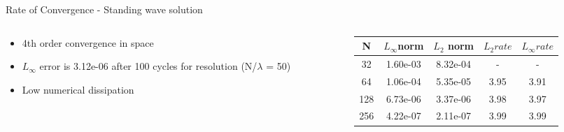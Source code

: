 \documentclass[10pt, aspectratio=169]{beamer}
\begin{document}
\begin{frame}{Rate of Convergence - Standing wave solution}
	\begin{columns}
		\begin{column}{0.45\textwidth}
			\begin{itemize}
				\item 4th order convergence in space
				\item $L_{\infty}$ error is 3.12e-06 after 100 cycles for resolution (N/$\lambda$ = 50)
				\item Low numerical dissipation
			\end{itemize}
		\end{column}
		\begin{column}{0.55\textwidth}
			\begin{tabular}{ |c|c|c|c|c| } 
				\hline
				N   & $L_{\infty}$norm & $L_{2}$ norm & $L_{2} rate$ & $L_{\infty} rate$ \\ 
				\hline
				32  & 1.60e-03         & 8.32e-04     & -            & -                 \\
				64  & 1.06e-04         & 5.35e-05     & 3.95         & 3.91              \\
				128 & 6.73e-06         & 3.37e-06     & 3.98         & 3.97              \\
				256 & 4.22e-07         & 2.11e-07     & 3.99         & 3.99              \\
				\hline
			\end{tabular}

		\end{column}
	\end{columns}	
\end{frame}
\end{document}
